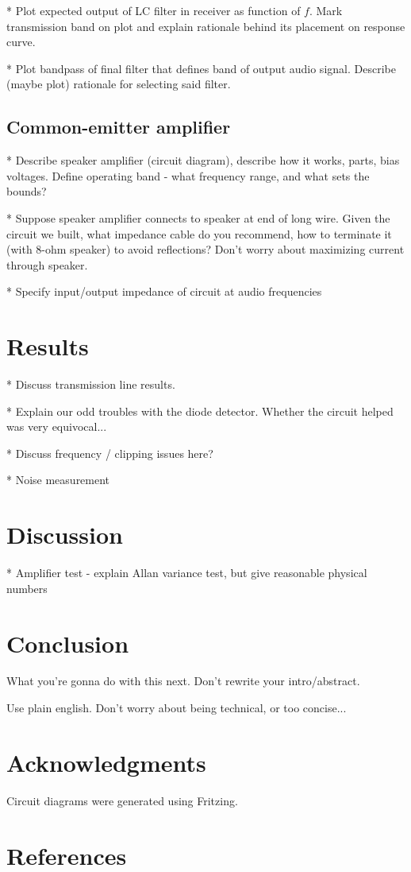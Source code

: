 \documentclass[11pt]{article}
\begin{document}
* Plot expected output of LC filter in receiver as function of $f$.  Mark transmission band on plot and explain rationale behind its placement on response curve.

* Plot bandpass of final filter that defines band of output audio signal.  Describe (maybe plot) rationale for selecting said filter.

\subsection{Common-emitter amplifier}

* Describe speaker amplifier (circuit diagram), describe how it works, parts, bias voltages.  Define operating band - what frequency range, and what sets the bounds?

* Suppose speaker amplifier connects to speaker at end of long wire.  Given the circuit we built, what impedance cable do you recommend, how to terminate it (with 8-ohm speaker) to avoid reflections?  Don't worry about maximizing current through speaker.

* Specify input/output impedance of circuit at audio frequencies



\section{Results}

* Discuss transmission line results.

* Explain our odd troubles with the diode detector.  Whether the circuit helped was very equivocal...

* Discuss frequency / clipping issues here?

* Noise measurement

\section{Discussion}

* Amplifier test - explain Allan variance test, but give reasonable physical numbers

\section{Conclusion}

What you're gonna do with this next.  Don't rewrite your intro/abstract.

Use plain english.  Don't worry about being technical, or too concise...

\section{Acknowledgments}

Circuit diagrams were generated using Fritzing.

\section{References}
\end{document}
